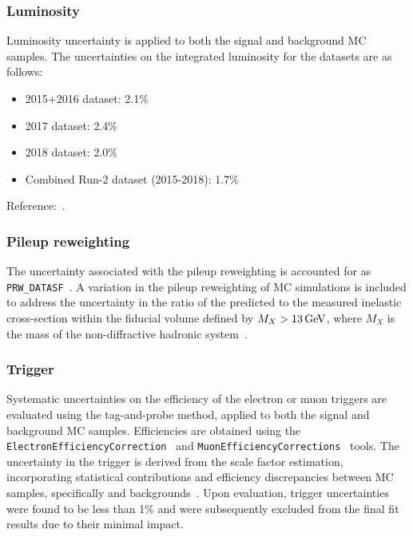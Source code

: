 \clearpage
\subsubsection*{Luminosity}
Luminosity uncertainty is applied to both the signal and background MC samples.
The uncertainties on the integrated luminosity for the datasets are as follows:
\begin{itemize}
    \item 2015+2016 dataset: 2.1\%
    \item 2017 dataset: 2.4\%
    \item 2018 dataset: 2.0\%
    \item Combined Run-2 dataset (2015-2018): 1.7\%
\end{itemize}
Reference:~\cite{AtlasLumiRun2}.


\subsubsection*{Pileup reweighting}
The uncertainty associated with the pileup reweighting is accounted for as \texttt{PRW\_DATASF}~\cite{ExtendedPileupReweighting}. 
A variation in the pileup reweighting of MC simulations is included to address the uncertainty in the ratio of the predicted to the measured inelastic cross-section within the fiducial volume defined by $M_X > 13\,\text{Ge\kern -0.1em V}$, where $M_X$ is the mass of the non-diffractive hadronic system~\cite{STDM-2015-05}.


\subsubsection*{Trigger}
Systematic uncertainties on the efficiency of the electron or muon triggers are evaluated using the tag-and-probe method, applied to both the signal and background MC samples. Efficiencies are obtained using the \texttt{ElectronEfficiencyCorrection}~\cite{AsgElectronEfficiencyCorrectionTool} and \texttt{MuonEfficiencyCorrections}~\cite{TrigMuonEfficiency} tools. The uncertainty in the \met trigger is derived from the scale factor estimation, incorporating statistical contributions and efficiency discrepancies between MC samples, specifically \ttbar and \Wjets backgrounds~\cite{ATLAS-CONF-2016-091, Masubuchi:2151844}. Upon evaluation, trigger uncertainties were found to be less than 1\% and were subsequently excluded from the final fit results due to their minimal impact.

